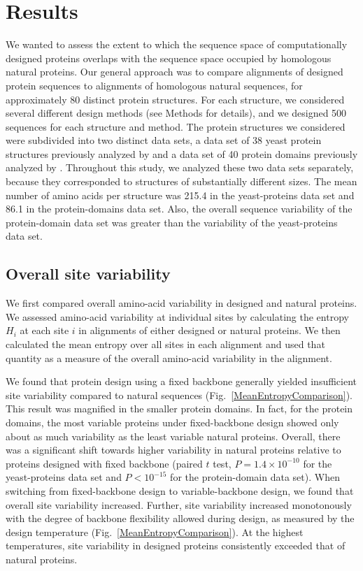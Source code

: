 \documentclass[12pt]{article}
\begin{document}
\section{Results}
\label{Results}

We wanted to assess the extent to which the sequence space of computationally designed proteins overlaps with the sequence space occupied by homologous natural proteins. Our general approach was to compare alignments of designed protein sequences to alignments of homologous natural sequences, for approximately 80 distinct protein structures. For each structure, we considered several different design methods (see Methods for details), and we designed 500 sequences for each structure and method. The protein structures we considered were subdivided into two distinct data sets, a data set of 38 yeast protein structures previously analyzed by \citet{Ramsey2011} and a data set of 40 protein domains previously analyzed by \citet{OllikainenKortemme}. Throughout this study, we analyzed these two data sets separately, because they corresponded to structures of substantially different sizes. The mean number of amino acids per structure was 215.4 in the yeast-proteins data set and 86.1 in the protein-domains data set. Also, the overall sequence variability of the protein-domain data set was greater than the variability of the yeast-proteins data set. 

\subsection{Overall site variability}
\label{SiteVariability}

We first compared overall amino-acid variability in designed and natural proteins. We assessed amino-acid variability at individual sites by calculating the entropy $H_i$ at each site $i$ in alignments of either designed or natural proteins. We then calculated the mean entropy over all sites in each alignment and used that quantity as a measure of the overall amino-acid variability in the alignment.

We found that protein design using a fixed backbone generally yielded insufficient site variability compared to natural sequences (Fig.~\ref{MeanEntropyComparison}).  This result was magnified in the smaller protein domains. In fact, for the protein domains, the most variable proteins under fixed-backbone design showed only about as much variability as the least variable natural proteins. Overall, there was a significant shift towards higher variability in natural proteins relative to proteins designed with fixed backbone (paired $t$ test, $P = 1.4\times10^{-10}$ for the yeast-proteins data set and $P<10^{-15}$ for the protein-domain data set). When switching from fixed-backbone design to variable-backbone design, we found that overall site variability increased. Further, site variability increased monotonously with the degree of backbone flexibility allowed during design, as measured by the design temperature (Fig.~\ref{MeanEntropyComparison}). At the highest temperatures, site variability in designed proteins consistently exceeded that of natural proteins. 
\end{document}
